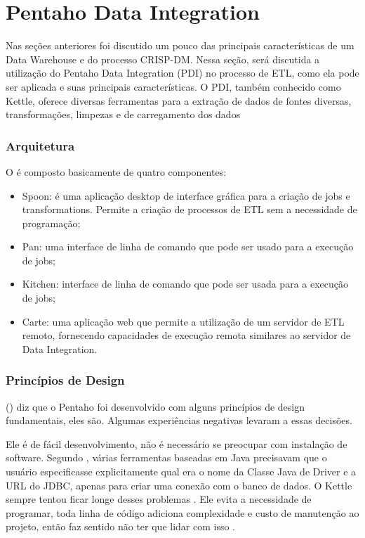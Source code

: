 \section{Pentaho Data Integration}
Nas seções anteriores foi discutido um pouco das principais características de um Data Warehouse e do processo CRISP-DM. Nessa seção, será discutida a utilização do Pentaho Data Integration (PDI) no processo de ETL, como ela pode ser aplicada e suas principais características.
O PDI, também conhecido como Kettle, oferece diversas ferramentas para a extração de dados de fontes diversas, transformações, limpezas e de carregamento dos dados
\subsubsection{Arquitetura}
O \pdi é composto basicamente de quatro componentes:
\begin{itemize}
    \item Spoon: é uma aplicação desktop de interface gráfica para a criação de jobs e transformations. Permite a criação de processos de ETL sem a necessidade de programação;
    \item Pan: uma interface de linha de comando que pode ser usado para a execução de jobs;
    \item Kitchen: interface de linha de comando que pode ser usada para a execução de jobs;
    \item Carte: uma aplicação web que permite a utilização de um servidor de ETL remoto, fornecendo capacidades de execução remota similares ao servidor de Data Integration.
\end{itemize}
\subsubsection{Princípios de Design}
\citeauthor{kettle}(\citeyear{kettle}) diz que o Pentaho foi desenvolvido com alguns princípios de design fundamentais, eles são. Algumas experiências negativas levaram a essas decisões.

Ele é de fácil desenvolvimento, não é necessário se preocupar com instalação de software. Segundo , várias ferramentas baseadas em Java precisavam que o usuário especificasse explicitamente qual era o nome da Classe Java de Driver e a URL do JDBC, apenas para criar uma conexão com o banco de dados. O Kettle sempre tentou ficar longe desses problemas \citep{kettle}. Ele evita a necessidade de programar, toda linha de código adiciona complexidade e custo de manutenção ao projeto, então faz sentido não ter que lidar com isso \citep{kettle}.

